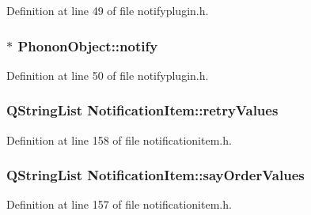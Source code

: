 \-Definition at line 49 of file notifyplugin.\-h.

\hypertarget{group___notify_plugin_ga82a15e7062562dabd14047b2e5398889}{
\subsubsection[{notify}]{$\ast$ {\bf \-Phonon\-Object\-::notify}}}\label{group___notify_plugin_ga82a15e7062562dabd14047b2e5398889}


\-Definition at line 50 of file notifyplugin.\-h.

\hypertarget{group___notify_plugin_ga7c47e100b3ea3f8b527dbdea2385edd0}{
\subsubsection[{retry\-Values}]{\setlength{\rightskip}{0pt plus 5cm}\-Q\-String\-List {\bf \-Notification\-Item\-::retry\-Values}}}\label{group___notify_plugin_ga7c47e100b3ea3f8b527dbdea2385edd0}


\-Definition at line 158 of file notificationitem.\-h.

\hypertarget{group___notify_plugin_ga856cd4e9d78e6c8900f9de74f0f25dac}{
\subsubsection[{say\-Order\-Values}]{\setlength{\rightskip}{0pt plus 5cm}\-Q\-String\-List {\bf \-Notification\-Item\-::say\-Order\-Values}}}\label{group___notify_plugin_ga856cd4e9d78e6c8900f9de74f0f25dac}


\-Definition at line 157 of file notificationitem.\-h.




